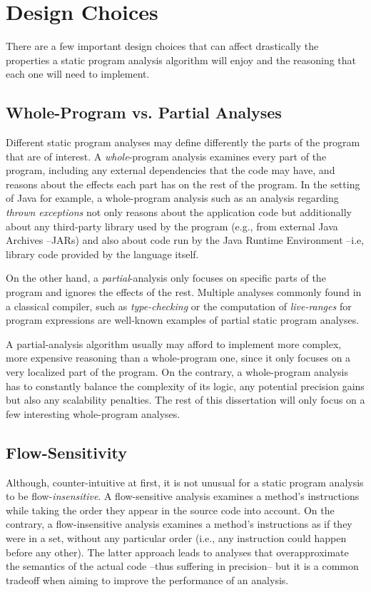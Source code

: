\section{Design Choices}

There are a few important design choices that can affect drastically the
properties a static program analysis algorithm will enjoy and the reasoning
that each one will need to implement.

\subsection{Whole-Program vs. Partial Analyses}

Different static program analyses may define differently the parts of the
program that are of interest. A \emph{whole}-program analysis examines every
part of the program, including any external dependencies that the code may
have, and reasons about the effects each part has on the rest of the program.
In the setting of Java for example, a whole-program analysis such as an
analysis regarding \emph{thrown exceptions} not only reasons about the
application code but additionally about any third-party library used by the
program (e.g., from external Java Archives --JARs) and also about code run by
the Java Runtime Environment --i.e, library code provided by the language
itself.

On the other hand, a \emph{partial}-analysis only focuses on specific parts of
the program and ignores the effects of the rest. Multiple analyses commonly
found in a classical compiler, such as \emph{type-checking} or the computation
of \emph{live-ranges} for program expressions are well-known examples of
partial static program analyses.

A partial-analysis algorithm usually may afford to implement more complex, more
expensive reasoning than a whole-program one, since it only focuses on a very
localized part of the program. On the contrary, a whole-program analysis has to
constantly balance the complexity of its logic,  any potential precision gains
but also any scalability penalties. The rest of this dissertation will only
focus on a few interesting whole-program analyses.

\subsection{Flow-Sensitivity} \label{flowSensitivity}

Although, counter-intuitive at first, it is not unusual for a static program
analysis to be flow-\emph{insensitive}. A flow-sensitive analysis examines a
method's instructions while taking the order they appear in the source code
into account. On the contrary, a flow-insensitive analysis examines a method's
instructions as if they were in a set, without any particular order (i.e., any
instruction could happen before any other). The latter approach leads to
analyses that overapproximate the semantics of the actual code --thus suffering
in precision-- but it is a common tradeoff when aiming to improve the
performance of an analysis.

